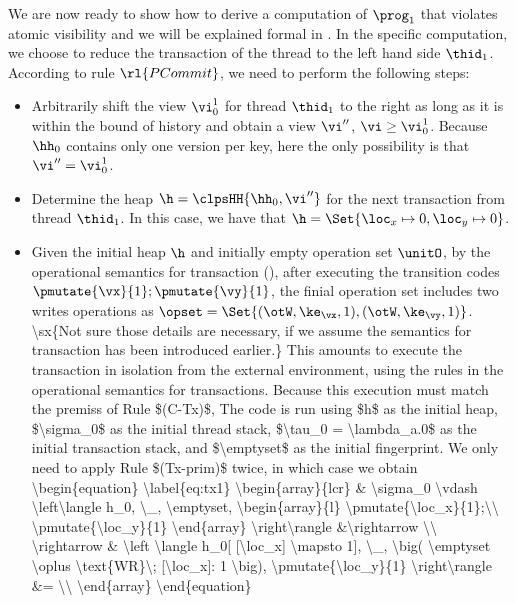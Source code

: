 We are now ready to show how to derive a computation of $\prog_1$ that violates atomic visibility and we will be explained formal in .
In the specific computation, we choose to reduce the transaction of the thread to the left hand side $\thid_1$.
According to rule $\rl{PCommit}$, we need to perform the following steps: 
\begin{itemize}
\item Arbitrarily shift the view $\vi_{0}^{1}$ for thread $\thid_1$ to the right as long as it is within the bound of history and obtain a view \(\vi'' \), \ie \( \vi \geq \vi_{0}^{1} \). Because $\hh_0$ contains only one version per key, here the only possibility is that $\vi'' = \vi_{0}^{1}$.
\item Determine the heap $\h = \clpsHH{\hh_0, \vi''}$ for the next transaction from thread $\thid_1$.
In this case, we have that $\h = \Set{\loc_x \mapsto 0, \loc_y \mapsto 0}$.
\item Given the initial heap \( \h \) and initially empty operation set \( \unitO \), by the operational semantics for transaction (), after executing the transition codes \( \pmutate{\vx}{1}; \pmutate{\vy}{1} \), the finial operation set includes two writes operations as $\opset = \Set{(\otW, \ke_{\vx}, 1), (\otW, \ke_{\vy}, 1)}$.
\ac{
\sx{Not sure those details are necessary, if we assume the semantics for transaction has been introduced earlier.}
This amounts to execute the transaction in isolation from the external environment, using the rules in the operational semantics for 
 transactions. Because this execution must match the premiss of Rule $(C-Tx)$,  The code is run using $h$ as the initial heap, $\sigma_0$ as the initial 
 thread stack, $\tau_0 = \lambda_a.0$ as the initial transaction stack, and $\emptyset$ as the 
 initial fingerprint. We only need to apply 
 Rule $(Tx-prim)$ twice, in which case we obtain
 \begin{equation}
\label{eq:tx1}
\begin{array}{lcr}
& \sigma_0 \vdash \left\langle h_0, \_, \emptyset, \begin{array}{l}
\pmutate{\loc_x}{1};\\ \pmutate{\loc_y}{1} \end{array} \right\rangle 
&\rightarrow \\
\rightarrow & 
\left \langle h_0[ [\loc_x] \mapsto 1], \_, \big( \emptyset \oplus \text{WR}\; [\loc_x]: 1 \big), 
\pmutate{\loc_y}{1} \right\rangle &= \\

\end{array}
\end{equation}}
\end{itemize}
